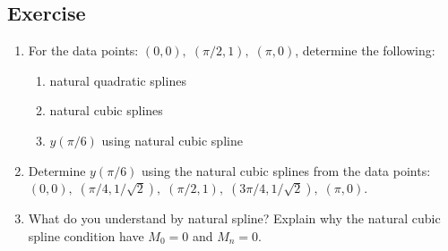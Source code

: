 \documentclass[aima203_lecturenotes_ku.tex]{subfiles}
\begin{document}
\subsection{Exercise}
\begin{enumerate}
\item For the data points: $(0,0), \; (\pi /2,1), \; (\pi,0)$, determine the following:
  \begin{enumerate}
  \item natural quadratic splines
  \item natural cubic splines
  \item $y(\pi /6)$ using natural cubic spline
  \end{enumerate}
\item Determine $y(\pi/6)$ using the natural cubic splines from the data points: \\ $(0,0), \; (\pi /4,1/ \sqrt{2}), \; (\pi /2 ,1), \; (3\pi /4, 1/ \sqrt{2}), \; (\pi,0)$.

\item What do you understand by natural spline? Explain why the natural cubic spline condition have $M_0 = 0$ and $M_n = 0$.
  \end{enumerate}
\end{document}
